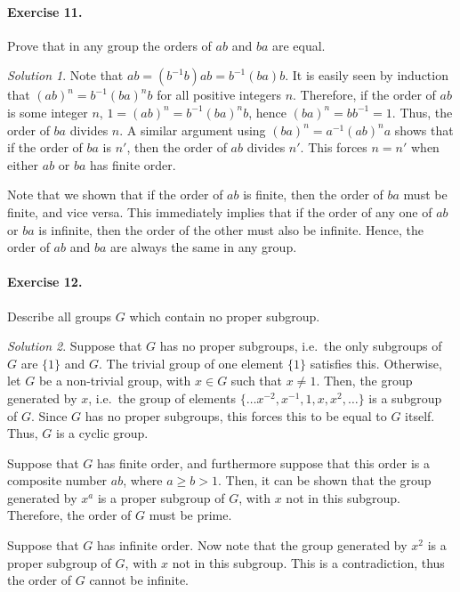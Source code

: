 \documentclass[11pt]{report}
\theoremstyle{remark}
\newtheorem*{solution}{Solution}
\begin{document}
    \paragraph{Exercise 11.} Prove that in any group the orders of $ab$ and $ba$ are
    equal.
    \begin{solution}
        Note that $ab = (b^{-1}b)ab = b^{-1}(ba)b$. It is easily seen by induction that
        $(ab)^n = b^{-1}(ba)^nb$ for all positive integers $n$. Therefore, if the
        order of $ab$ is some integer $n$, $1 = (ab)^n = b^{-1}(ba)^nb$,
        hence $(ba)^n = bb^{-1} = 1$. Thus, the order of $ba$ divides $n$. A similar
        argument using $(ba)^n = a^{-1}(ab)^na$ shows that if the order of $ba$ is
        $n'$, then the order of $ab$ divides $n'$. This forces $n = n'$ when either
        $ab$ or $ba$ has finite order.

        Note that we shown that if the order of $ab$ is finite, then the order of
        $ba$ must be finite, and vice versa. This immediately implies that if the
        order of any one of $ab$ or $ba$ is infinite, then the order of the other
        must also be infinite. Hence, the order of $ab$ and $ba$ are always the same
        in any group.
    \end{solution}
    
    \paragraph{Exercise 12.} Describe all groups $G$ which contain no proper
    subgroup.
    \begin{solution}
        Suppose that $G$ has no proper subgroups, i.e.\ the only subgroups of $G$
        are $\{1\}$ and $G$. The trivial group of one element $\{1\}$ satisfies
        this. Otherwise, let $G$ be a non-trivial group, with $x \in G$ such that $x
        \neq 1$. Then, the group generated by $x$, i.e.\ the group of elements
        $\{\dots x^{-2}, x^{-1}, 1, x, x^2, \dots\}$ is a subgroup of $G$. Since $G$
        has no proper subgroups, this forces this to be equal to $G$ itself.
        Thus, $G$ is a cyclic group.

        Suppose that $G$ has finite order, and furthermore suppose that this order
        is a composite number $ab$, where $a \geq b > 1$. Then, it can be shown that
        the group generated by $x^a$ is a proper subgroup of $G$, with $x$ not in
        this subgroup. Therefore, the order of $G$ must be prime.

        Suppose that $G$ has infinite order. Now note that the group generated by
        $x^2$ is a proper subgroup of $G$, with $x$ not in this subgroup. This is a
        contradiction, thus the order of $G$ cannot be infinite.
    \end{solution}
\end{document}
